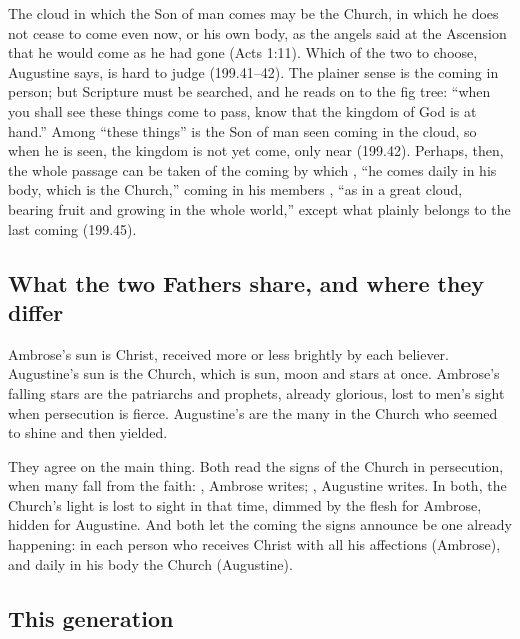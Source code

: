 The cloud in which the Son of man comes may be the Church, in which he does
not cease to come even now, or his own body, as the angels said at the
Ascension that he would come as he had gone (Acts 1:11). Which of the two to
choose, Augustine says, is hard to judge (199.41--42). The plainer sense is the
coming in person; but Scripture must be searched, and he reads on to the fig
tree: ``when you shall see these things come to pass, know that the kingdom
of God is at hand.'' Among ``these things'' is the Son of man seen coming in
the cloud, so when he is seen, the kingdom is not yet come, only near
(199.42). Perhaps, then, the whole passage can be taken of the coming by which
, ``he comes daily in
his body, which is the Church,'' coming in his members , ``as in a great
cloud, bearing fruit and growing in the whole world,'' except what plainly
belongs to the last coming (199.45).

\subsection{What the two Fathers share, and where they differ}

Ambrose's sun is Christ, received more or less brightly by each believer.
Augustine's sun is the Church, which is sun, moon and stars at once.
Ambrose's falling stars are the patriarchs and prophets, already glorious,
lost to men's sight when persecution is fierce. Augustine's are the many in
the Church who seemed to shine and then yielded.

They agree on the main thing. Both read the signs of the Church in
persecution, when many fall from the faith: , Ambrose writes; , Augustine writes. In both, the Church's light is lost to sight in
that time, dimmed by the flesh for Ambrose, hidden for Augustine. And both let
the coming the signs announce be one already happening: in each person who
receives Christ with all his affections (Ambrose), and daily in his body the
Church (Augustine).

\subsection{This generation}


